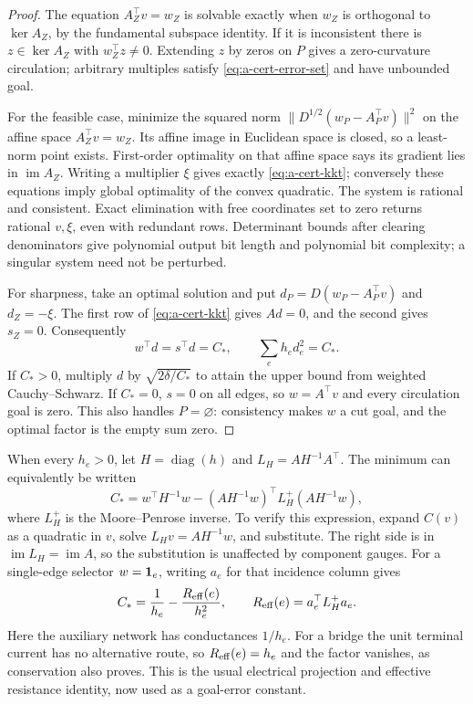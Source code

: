 \begin{proof}
The equation $A_Z^\top v=w_Z$ is solvable exactly when $w_Z$
is orthogonal to $\ker A_Z$, by the fundamental subspace identity.
If it is inconsistent there is $z\in\ker A_Z$ with
$w_Z^\top z\ne0$. Extending $z$ by zeros on $P$ gives a
zero-curvature circulation; arbitrary multiples satisfy
\eqref{eq:a-cert-error-set} and have unbounded goal.

For the feasible case, minimize the squared norm
$\|D^{1/2}(w_P-A_P^\top v)\|^2$ on the affine space
$A_Z^\top v=w_Z$. Its affine image in Euclidean space is closed,
so a least-norm point exists. First-order optimality on that affine
space says its gradient lies in $\operatorname{im}A_Z$.
Writing a multiplier $\xi$ gives exactly
\eqref{eq:a-cert-kkt}; conversely these equations imply global
optimality of the convex quadratic. The system is rational and
consistent. Exact elimination with free coordinates set to zero
returns rational $v,\xi$, even with redundant rows. Determinant
bounds after clearing denominators give polynomial output bit length
and polynomial bit complexity; a singular system need not be perturbed.

For sharpness, take an optimal solution and put
$d_P=D(w_P-A_P^\top v)$ and $d_Z=-\xi$.
The first row of \eqref{eq:a-cert-kkt} gives $Ad=0$, and the
second gives $s_Z=0$. Consequently
\[
 w^\top d=s^\top d=C_*,\qquad \sum_e h_ed_e^2=C_*.
\]
If $C_*>0$, multiply $d$ by $\sqrt{2\delta/C_*}$ to attain
the upper bound from weighted Cauchy--Schwarz. If $C_*=0$,
$s=0$ on all edges, so $w=A^\top v$ and every circulation goal
is zero. This also handles $P=\varnothing$: consistency makes
$w$ a cut goal, and the optimal factor is the empty sum zero.
\end{proof}

When every $h_e>0$, let $H=\operatorname{diag}(h)$ and
$L_H=AH^{-1}A^\top$. The minimum can equivalently be written
\begin{equation}
 C_*=w^\top H^{-1}w-
 (AH^{-1}w)^\top L_H^+(AH^{-1}w),
 \label{eq:a-cert-effective}
\end{equation}
where $L_H^+$ is the Moore--Penrose inverse. To verify this expression,
expand $C(v)$ as a quadratic in $v$, solve
$L_Hv=AH^{-1}w$, and substitute. The right side is in
$\operatorname{im}L_H=\operatorname{im}A$, so the substitution
is unaffected by component gauges. For a single-edge selector
$w=\mathbf{1}_e$, writing $a_e$ for that incidence column gives
\[
 C_*=\frac1{h_e}-\frac{R_{\rm eff}(e)}{h_e^2},\qquad
 R_{\rm eff}(e)=a_e^\top L_H^+a_e.
\]
Here the auxiliary network has conductances $1/h_e$.
For a bridge the unit terminal current has no alternative route,
so $R_{\rm eff}(e)=h_e$ and the factor vanishes, as conservation
also proves. This is the usual electrical projection and effective
resistance identity, now used as a goal-error constant.

